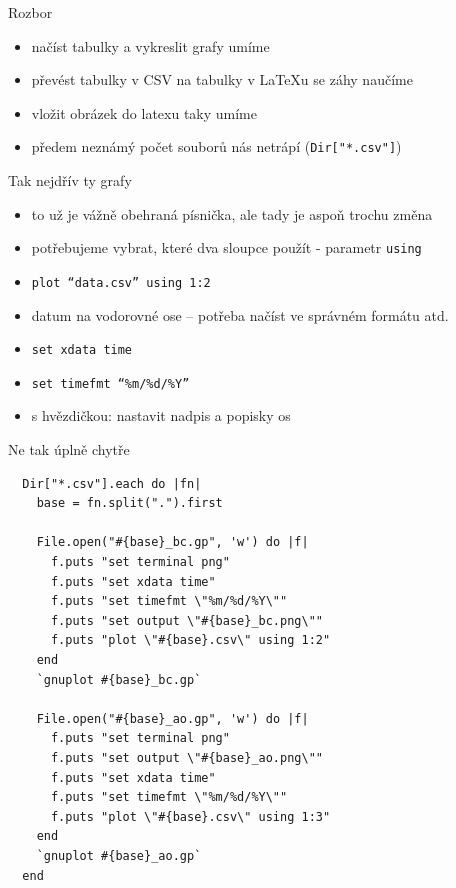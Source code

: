 \documentclass{beamer}
\begin{document}
\begin{frame}{Rozbor}
  \begin{itemize}
    \item načíst tabulky a vykreslit grafy umíme
    \item převést tabulky v CSV na tabulky v LaTeXu se záhy naučíme
    \item vložit obrázek do latexu taky umíme
    \item předem neznámý počet souborů nás netrápí (\texttt{Dir["*.csv"]})
  \end{itemize}
\end{frame}

\begin{frame}{Tak nejdřív ty grafy}
  \begin{itemize}
    \item to už je vážně obehraná písnička, ale tady je aspoň trochu změna
    \item potřebujeme vybrat, které dva sloupce použít - parametr \texttt{using}
    \item \texttt{plot ``data.csv'' using 1:2}
    \item datum na vodorovné ose -- potřeba načíst ve správném formátu atd.
    \item \texttt{set xdata time}
    \item \texttt{set timefmt ``\%m/\%d/\%Y''}
    \item s hvězdičkou: nastavit nadpis a popisky os
  \end{itemize}
\end{frame}

\begin{frame}[fragile]{Ne tak úplně chytře}
  \tiny
\begin{verbatim}
  Dir["*.csv"].each do |fn|
    base = fn.split(".").first

    File.open("#{base}_bc.gp", 'w') do |f|
      f.puts "set terminal png"
      f.puts "set xdata time"
      f.puts "set timefmt \"%m/%d/%Y\""
      f.puts "set output \"#{base}_bc.png\""
      f.puts "plot \"#{base}.csv\" using 1:2"
    end
    `gnuplot #{base}_bc.gp`

    File.open("#{base}_ao.gp", 'w') do |f|
      f.puts "set terminal png"
      f.puts "set output \"#{base}_ao.png\""
      f.puts "set xdata time"
      f.puts "set timefmt \"%m/%d/%Y\""
      f.puts "plot \"#{base}.csv\" using 1:3"
    end
    `gnuplot #{base}_ao.gp`
  end
\end{verbatim}
\end{frame}
\end{document}
